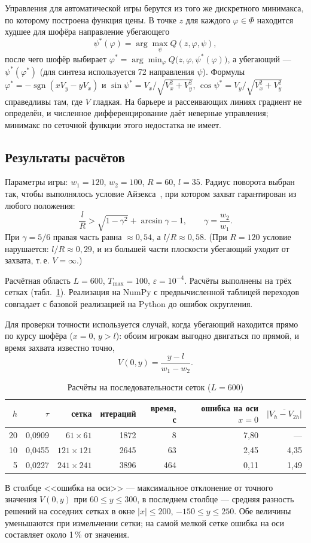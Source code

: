 \documentclass[14pt,a4paper]{extarticle}
\begin{document}
	Управления для автоматической игры берутся из того же дискретного минимакса, по которому построена функция цены. В точке $z$ для каждого $\varphi\in\Phi$ находится худшее для шофёра направление убегающего
	\[
	\psi^{*}(\varphi)=\arg\max_{\psi} Q(z,\varphi,\psi),
	\]
	после чего шофёр выбирает $\varphi^{*}=\arg\min_{\varphi}Q\bigl(z,\varphi,\psi^{*}(\varphi)\bigr)$, а убегающий --- $\psi^{*}(\varphi^{*})$ (для синтеза используется 72 направления $\psi$). Формулы $\varphi^{*}=-\operatorname{sgn}(xV_y-yV_x)$ и $\sin\psi^{*}=V_x/\sqrt{V_x^2+V_y^2}$, $\cos\psi^{*}=V_y/\sqrt{V_x^2+V_y^2}$ справедливы там, где $V$ гладкая. На барьере и рассеивающих линиях градиент не определён, и численное дифференцирование даёт неверные управления; минимакс по сеточной функции этого недостатка не имеет.

	\subsection{Результаты расчётов}

	Параметры игры: $w_1=120$, $w_2=100$, $R=60$, $l=35$. Радиус поворота выбран так, чтобы выполнялось условие Айзекса~\cite{isaacs}, при котором захват гарантирован из любого положения:
	\[
	\frac{l}{R}>\sqrt{1-\gamma^2}+\arcsin\gamma-1,\qquad \gamma=\frac{w_2}{w_1}.
	\]
	При $\gamma=5/6$ правая часть равна $\approx 0{,}54$, а $l/R\approx 0{,}58$. (При $R=120$ условие нарушается: $l/R\approx 0{,}29$, и из большей части плоскости убегающий уходит от захвата, т.\,е. $V=\infty$.)

	Расчётная область $L=600$, $T_{\max}=100$, $\varepsilon=10^{-4}$. Расчёты выполнены на трёх сетках (табл.~\ref{tab:runs}). Реализация на NumPy с предвычисленной таблицей переходов совпадает с базовой реализацией на Python до ошибок округления.

	Для проверки точности используется случай, когда убегающий находится прямо по курсу шофёра ($x=0$, $y>l$): обоим игрокам выгодно двигаться по прямой, и время захвата известно точно,
	\[
	V(0,y)=\frac{y-l}{w_1-w_2}.
	\]

	\begin{table}[H]
		\centering
		\caption{Расчёты на последовательности сеток ($L=600$)}
		\label{tab:runs}
		\small
		\begin{tabular}{rrrrrrr}
			\hline
			$h$ & $\tau$ & сетка & итераций & время, с & ошибка на оси $x=0$ & $\overline{|V_h-V_{2h}|}$ \\
			\hline
			20 & 0{,}0909 & $61\times61$ & 1872 & 8 & 7{,}80 & --- \\
			10 & 0{,}0455 & $121\times121$ & 2645 & 63 & 2{,}45 & 4{,}35 \\
			5 & 0{,}0227 & $241\times241$ & 3896 & 464 & 0{,}11 & 1{,}49 \\
			\hline
		\end{tabular}
	\end{table}
	В столбце <<ошибка на оси>> --- максимальное отклонение от точного значения $V(0,y)$ при $60\le y\le 300$, в последнем столбце --- средняя разность решений на соседних сетках в окне $|x|\le 200$, $-150\le y\le 250$. Обе величины уменьшаются при измельчении сетки; на самой мелкой сетке ошибка на оси составляет около 1\,\% от значения.
\end{document}
